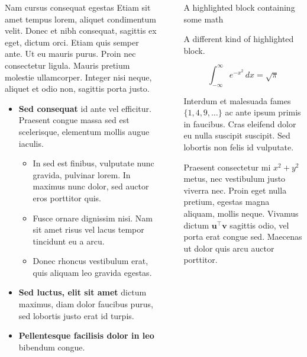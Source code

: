 \documentclass[final]{beamer}
\newlength{\sepwidth}
\newlength{\colwidth}
\newcommand{\separatorcolumn}{\begin{column}{\sepwidth}\end{column}}
\begin{document}
\begin{frame}[t]
\begin{columns}[t]
\begin{column}{\colwidth}
\begin{block}{Nam cursus consequat egestas}
    Etiam sit amet tempus lorem, aliquet condimentum velit. Donec et nibh
    consequat, sagittis ex eget, dictum orci. Etiam quis semper ante. Ut eu
    mauris purus. Proin nec consectetur ligula. Mauris pretium molestie
    ullamcorper. Integer nisi neque, aliquet et odio non, sagittis porta justo.

    \begin{itemize}
      \item \textbf{Sed consequat} id ante vel efficitur. Praesent congue massa
        sed est scelerisque, elementum mollis augue iaculis.
        \begin{itemize}
          \item In sed est finibus, vulputate
            nunc gravida, pulvinar lorem. In maximus nunc dolor, sed auctor eros
            porttitor quis.
          \item Fusce ornare dignissim nisi. Nam sit amet risus vel lacus
            tempor tincidunt eu a arcu.
          \item Donec rhoncus vestibulum erat, quis aliquam leo
            gravida egestas.
        \end{itemize}
      \item \textbf{Sed luctus, elit sit amet} dictum maximus, diam dolor
        faucibus purus, sed lobortis justo erat id turpis.
      \item \textbf{Pellentesque facilisis dolor in leo} bibendum congue.
    \end{itemize}

  \end{block}

\end{column}

\separatorcolumn

\begin{column}{\colwidth}

  \begin{exampleblock}{A highlighted block containing some math}

    A different kind of highlighted block.

    $$
    \int_{-\infty}^{\infty} e^{-x^2}\,dx = \sqrt{\pi}
    $$

    Interdum et malesuada fames $\{1, 4, 9, \ldots\}$ ac ante ipsum primis in
    faucibus. Cras eleifend dolor eu nulla suscipit suscipit. Sed lobortis non
    felis id vulputate.


    Praesent consectetur mi $x^2 + y^2$ metus, nec vestibulum justo viverra
    nec. Proin eget nulla pretium, egestas magna aliquam, mollis neque. Vivamus
    dictum $\mathbf{u}^\intercal\mathbf{v}$ sagittis odio, vel porta erat
    congue sed. Maecenas ut dolor quis arcu auctor porttitor.


\end{exampleblock}
\end{column}
\end{columns}
\end{frame}
\end{document}
